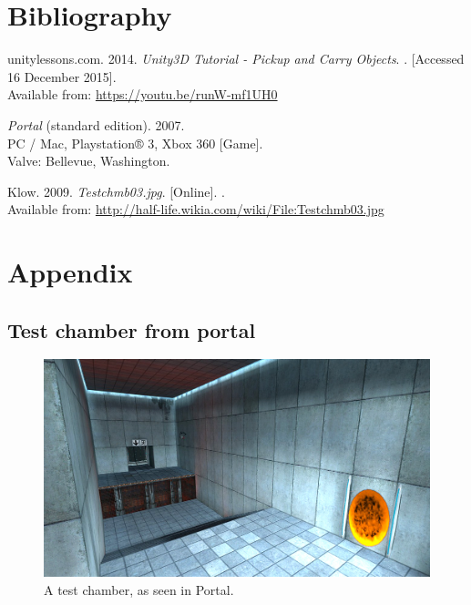 \section{Bibliography}
\begin{thebibliography}{widestlabel}
	unitylessons.com. 2014. \textit{Unity3D Tutorial - Pickup and Carry Objects}.
	\newline
	[Online]. [Accessed 16 December 2015].\\
	Available from: \url{https://youtu.be/runW-mf1UH0}
	
	\textit{Portal} (standard edition). 2007.\\
	PC / Mac, Playstation® 3, Xbox 360 [Game].\\
	Valve: Bellevue, Washington.
	
	Klow. 2009. \textit{Testchmb03.jpg}. [Online].
	.\\
	Available from: \url{http://half-life.wikia.com/wiki/File:Testchmb03.jpg}
\end{thebibliography}

\section{Appendix}
\subsection{Test chamber from portal}
\begin{figure}[h]
	\centering
	\includegraphics[scale=0.5]{pictures/portalChamber.jpg}
	\caption{A test chamber, as seen in Portal.\cite{portalChamberPic}}
	\label{portalChamber}
\end{figure}
